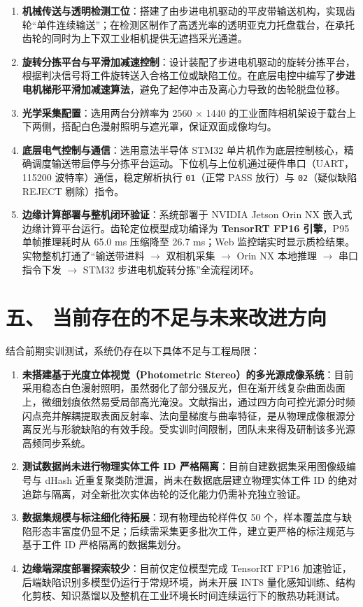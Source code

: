 \begin{enumerate}
    \item \textbf{机械传送与透明检测工位}：搭建了由步进电机驱动的平皮带输送机构，实现齿轮“单件连续输送”；在检测区制作了高透光率的透明亚克力托盘载台，在承托齿轮的同时为上下双工业相机提供无遮挡采光通道。
    \item \textbf{旋转分拣平台与平滑加减速控制}：设计装配了步进电机驱动的旋转分拣平台，根据判决信号将工件旋转送入合格工位或缺陷工位。在底层电控中编写了\textbf{步进电机梯形平滑加减速算法}，避免了起停冲击及离心力导致的齿轮脱盘位移。
    \item \textbf{光学采集配置}：选用两台分辨率为 2560 $\times$ 1440 的工业面阵相机架设于载台上下两侧，搭配白色漫射照明与遮光罩，保证双面成像均匀。
    \item \textbf{底层电气控制与通信}：选用意法半导体 STM32 单片机作为底层控制核心，精确调度输送带启停与分拣平台运动。下位机与上位机通过硬件串口（UART，115200 波特率）通信，稳定解析执行 \texttt{01}（正常 PASS 放行）与 \texttt{02}（疑似缺陷 REJECT 剔除）指令。
    \item \textbf{边缘计算部署与整机闭环验证}：系统部署于 NVIDIA Jetson Orin NX 嵌入式边缘计算平台运行。齿轮定位模型成功编译为 \textbf{TensorRT FP16 引擎}，P95 单帧推理耗时从 65.0 ms 压缩降至 26.7 ms；Web 监控端实时显示质检结果。实物整机打通了“输送带进料 $\rightarrow$ 双相机采集 $\rightarrow$ Orin NX 本地推理 $\rightarrow$ 串口指令下发 $\rightarrow$ STM32 步进电机旋转分拣”全流程闭环。
\end{enumerate}

\section*{五、 当前存在的不足与未来改进方向}

结合前期实训测试，系统仍存在以下具体不足与工程局限：

\begin{enumerate}
    \item \textbf{未搭建基于光度立体视觉（Photometric Stereo）的多光源成像系统}：目前采用稳态白色漫射照明，虽然弱化了部分强反光，但在渐开线复杂曲面齿面上，微细划痕依然易受局部高光淹没。文献指出，通过四方向可控光源分时频闪点亮并解耦提取表面反射率、法向量梯度与曲率特征，是从物理成像根源分离反光与形貌缺陷的有效手段。受实训时间限制，团队未来得及研制该多光源高频同步系统。
    \item \textbf{测试数据尚未进行物理实体工件 ID 严格隔离}：目前自建数据集采用图像级编号与 dHash 近重复聚类防泄漏，尚未在数据底层建立物理实体工件 ID 的绝对追踪与隔离，对全新批次实体齿轮的泛化能力仍需补充独立验证。
    \item \textbf{数据集规模与标注细化待拓展}：现有物理齿轮样件仅 50 个，样本覆盖度与缺陷形态丰富度仍显不足；后续需采集更多批次工件，建立更严格的标注规范与基于工件 ID 严格隔离的数据集划分。
    \item \textbf{边缘端深度部署探索较少}：目前仅定位模型完成 TensorRT FP16 加速验证，后端缺陷识别多模型仍运行于常规环境，尚未开展 INT8 量化感知训练、结构化剪枝、知识蒸馏以及整机在工业环境长时间连续运行下的散热功耗测试。
\end{enumerate}


